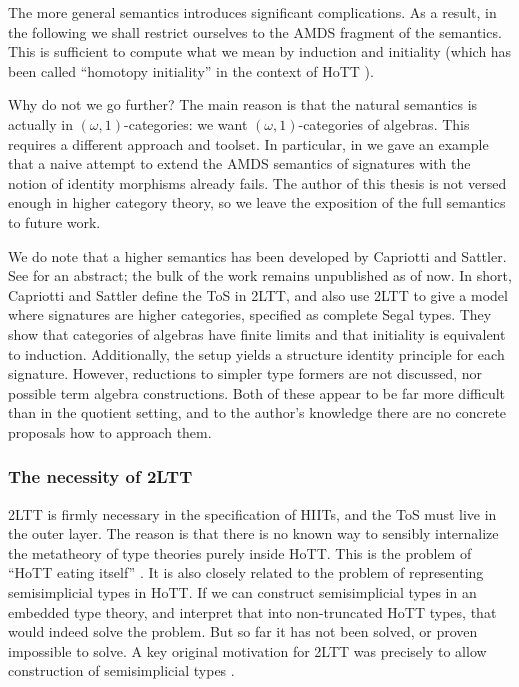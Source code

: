 \documentclass[12pt,a4paper,twoside,openany]{book}
\theoremstyle{remark}
\theoremstyle{definition}
\theoremstyle{theorem}
\begin{document}
The more general semantics introduces significant complications. As a result, in
the following we shall restrict ourselves to the AMDS fragment of the semantics.
This is sufficient to compute what we mean by induction and initiality (which
has been called ``homotopy initiality'' in the context of HoTT
\cite{sojakova}).

Why do not we go further? The main reason is that the natural semantics is
actually in $(\omega,1)$-categories: we want $(\omega,1)$-categories of
algebras. This requires a different approach and toolset. In particular, in
\cite[Section~9]{hiits} we gave an example that a naive attempt to extend the AMDS
semantics of signatures with the notion of identity morphisms already fails.
The author of this thesis is not versed enough in higher category theory, so we
leave the exposition of the full semantics to future work.


We do note that a higher semantics has been developed by Capriotti and
Sattler. See \cite{capriotti2020higher} for an abstract; the bulk of the work
remains unpublished as of now. In short, Capriotti and Sattler define the ToS in
2LTT, and also use 2LTT to give a model where signatures are higher categories,
specified as complete Segal types. They show that categories of algebras have
finite limits and that initiality is equivalent to induction. Additionally, the
setup yields a structure identity principle for each signature. However,
reductions to simpler type formers are not discussed, nor possible term algebra
constructions. Both of these appear to be far more difficult than in the
quotient setting, and to the author's knowledge there are no concrete proposals
how to approach them.

\subsubsection{The necessity of 2LTT}

2LTT is firmly necessary in the specification of HIITs, and the ToS must live in
the outer layer. The reason is that there is no known way to sensibly
internalize the metatheory of type theories purely inside HoTT. This is the
problem of ``HoTT eating itself'' \cite{hott-eat-itself}. It is also closely
related to the problem of representing semisimplicial types in HoTT. If we can
construct semisimplicial types in an embedded type theory, and interpret that
into non-truncated HoTT types, that would indeed solve the problem. But so far
it has not been solved, or proven impossible to solve. A key original motivation
for 2LTT was precisely to allow construction of semisimplicial types
\cite{twolevel}.
\end{document}
